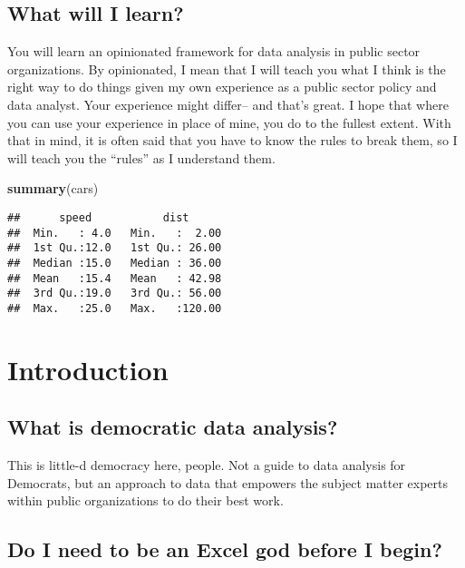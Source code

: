 \documentclass[]{book}
\newenvironment{Shaded}{\begin{snugshade}}{\end{snugshade}}
\newcommand{\KeywordTok}[1]{\textcolor[rgb]{0.13,0.29,0.53}{\textbf{#1}}}
\newcommand{\NormalTok}[1]{#1}
\begin{document}
\section*{What will I learn?}\label{what-will-i-learn}

You will learn an opinionated framework for data analysis in public
sector organizations. By opinionated, I mean that I will teach you what
I think is the right way to do things given my own experience as a
public sector policy and data analyst. Your experience might differ--
and that's great. I hope that where you can use your experience in place
of mine, you do to the fullest extent. With that in mind, it is often
said that you have to know the rules to break them, so I will teach you
the ``rules'' as I understand them.

\begin{Shaded}
\begin{Highlighting}[]
\KeywordTok{summary}\NormalTok{(cars)}
\end{Highlighting}
\end{Shaded}

\begin{verbatim}
##      speed           dist       
##  Min.   : 4.0   Min.   :  2.00  
##  1st Qu.:12.0   1st Qu.: 26.00  
##  Median :15.0   Median : 36.00  
##  Mean   :15.4   Mean   : 42.98  
##  3rd Qu.:19.0   3rd Qu.: 56.00  
##  Max.   :25.0   Max.   :120.00
\end{verbatim}

\chapter{Introduction}\label{intro}

\section{What is democratic data
analysis?}\label{what-is-democratic-data-analysis}

This is little-d democracy here, people. Not a guide to data analysis
for Democrats, but an approach to data that empowers the subject matter
experts within public organizations to do their best work.

\section{Do I need to be an Excel god before I
begin?}\label{do-i-need-to-be-an-excel-god-before-i-begin}
\end{document}
